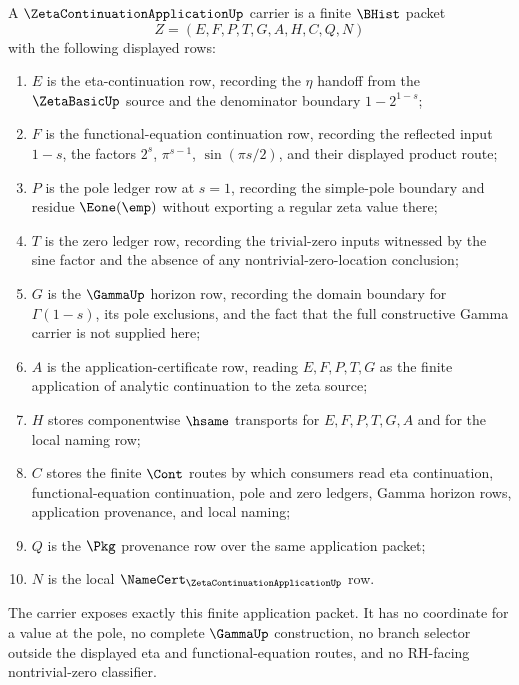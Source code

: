 \begin{definition}
\label{def:zeta-continuation-application-carrier}
A $\ZetaContinuationApplicationUp$ carrier is a finite $\BHist$ packet
$$
Z=(E,F,P,T,G,A,H,C,Q,N)
$$
with the following displayed rows:
\begin{enumerate}
\item $E$ is the eta-continuation row, recording the $\eta$ handoff from the $\ZetaBasicUp$ source and the denominator boundary $1-2^{1-s}$;
\item $F$ is the functional-equation continuation row, recording the reflected input $1-s$, the factors $2^s$, $\pi^{s-1}$, $\sin(\pi s/2)$, and their displayed product route;
\item $P$ is the pole ledger row at $s=1$, recording the simple-pole boundary and residue $\Eone(\emp)$ without exporting a regular zeta value there;
\item $T$ is the zero ledger row, recording the trivial-zero inputs witnessed by the sine factor and the absence of any nontrivial-zero-location conclusion;
\item $G$ is the $\GammaUp$ horizon row, recording the domain boundary for $\Gamma(1-s)$, its pole exclusions, and the fact that the full constructive Gamma carrier is not supplied here;
\item $A$ is the application-certificate row, reading $E,F,P,T,G$ as the finite application of analytic continuation to the zeta source;
\item $H$ stores componentwise $\hsame$ transports for $E,F,P,T,G,A$ and for the local naming row;
\item $C$ stores the finite $\Cont$ routes by which consumers read eta continuation, functional-equation continuation, pole and zero ledgers, Gamma horizon rows, application provenance, and local naming;
\item $Q$ is the $\Pkg$ provenance row over the same application packet;
\item $N$ is the local $\NameCert_{\ZetaContinuationApplicationUp}$ row.
\end{enumerate}
The carrier exposes exactly this finite application packet. It has no coordinate for a value at the pole, no complete $\GammaUp$ construction, no branch selector outside the displayed eta and functional-equation routes, and no RH-facing nontrivial-zero classifier.
\end{definition}

